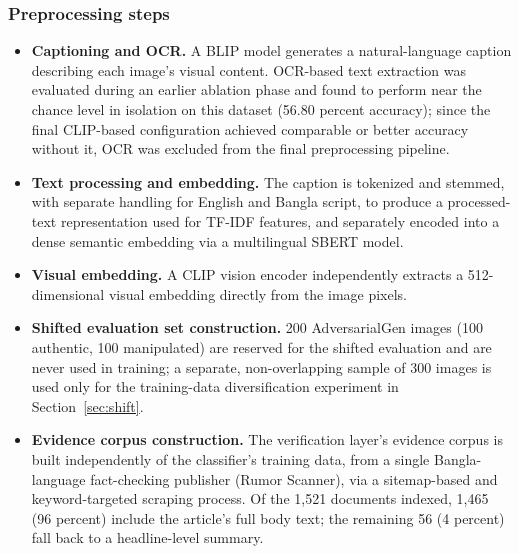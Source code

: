 \documentclass[conference,a4paper]{IEEEtran}
\begin{document}
\subsubsection{Preprocessing steps}

\begin{itemize}
\item \textbf{Captioning and OCR.} A BLIP model generates a natural-language
caption describing each image's visual content. OCR-based text extraction was
evaluated during an earlier ablation phase and found to perform near the
chance level in isolation on this dataset (56.80 percent accuracy); since the
final CLIP-based configuration achieved comparable or better accuracy without
it, OCR was excluded from the final preprocessing pipeline.

\item \textbf{Text processing and embedding.} The caption is tokenized and
stemmed, with separate handling for English and Bangla script, to produce a
processed-text representation used for TF-IDF features, and separately encoded
into a dense semantic embedding via a multilingual SBERT model.

\item \textbf{Visual embedding.} A CLIP vision encoder independently extracts
a 512-dimensional visual embedding directly from the image pixels.

\item \textbf{Shifted evaluation set construction.} 200 AdversarialGen images
(100 authentic, 100 manipulated) are reserved for the shifted evaluation and
are never used in training; a separate, non-overlapping sample of 300 images
is used only for the training-data diversification experiment in
Section~\ref{sec:shift}.

\item \textbf{Evidence corpus construction.} The verification layer's evidence
corpus is built independently of the classifier's training data, from a single
Bangla-language fact-checking publisher (Rumor Scanner), via a sitemap-based
and keyword-targeted scraping process. Of the 1{,}521 documents indexed,
1{,}465 (96 percent) include the article's full body text; the remaining 56
(4 percent) fall back to a headline-level summary.
\end{itemize}
\end{document}
